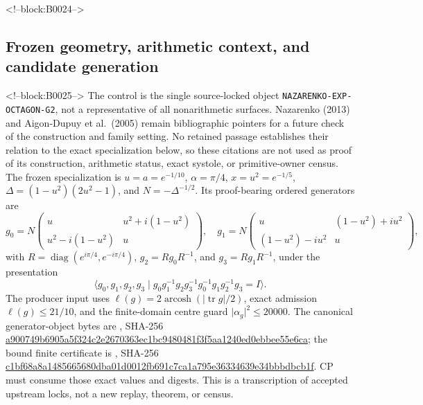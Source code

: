 \documentclass[11pt,a4paper]{article}
\begin{document}
<!--block:B0024-->
\hypertarget{frozen-geometry-arithmetic-context-and-candidate-generation}{%
\subsection{Frozen geometry, arithmetic context, and candidate generation}\label{frozen-geometry-arithmetic-context-and-candidate-generation}}

<!--block:B0025-->
The control is the single source-locked object \texttt{NAZARENKO-EXP-OCTAGON-G2}, not a representative of all nonarithmetic surfaces. Nazarenko (2013)
\citep{P33-S01}
 and Aigon-Dupuy et al.~(2005)
\citep{P33-S02}
 remain bibliographic pointers for a future check of the construction and family setting. No retained passage establishes their relation to the exact specialization below, so these citations are not used as proof of its construction, arithmetic status, exact systole, or primitive-owner census. The frozen specialization is \(u=a=e^{-1/10}\), \(\alpha=\pi/4\), \(x=u^2=e^{-1/5}\), \(\Delta=(1-u^2)(2u^2-1)\), and \(N=-\Delta^{-1/2}\). Its proof-bearing ordered generators are
\[
 g_0=N\begin{pmatrix}u&u^2+i(1-u^2)\\u^2-i(1-u^2)&u\end{pmatrix},\quad
 g_1=N\begin{pmatrix}u&(1-u^2)+iu^2\\(1-u^2)-iu^2&u\end{pmatrix},
\]
with \(R=\operatorname{diag}(e^{i\pi/4},e^{-i\pi/4})\), \(g_2=Rg_0R^{-1}\), and \(g_3=Rg_1R^{-1}\), under the presentation
\[
 \langle g_0,g_1,g_2,g_3\mid g_0g_1^{-1}g_2g_3^{-1}g_0^{-1}g_1g_2^{-1}g_3=I\rangle .
\]
The producer input uses \(\ell(g)=2\operatorname{arcosh}(|\operatorname{tr}g|/2)\), exact admission \(\ell(g)\leq21/10\), and the finite-domain centre guard \(\lvert\alpha_g\rvert^2\leq20000\). The canonical generator-object bytes are , SHA-256 \url{a900749b6905a5f324c2e2670363ec1bc9480481f3f5aa1240ed0ebbee55e6ca}; the bound finite certificate is , SHA-256 \url{c1bf68a8a1485665680dba01d0012fb691c7ca1a795e36334639e34bbbdbcb1f}. CP must consume those exact values and digests. This is a transcription of accepted upstream locks, not a new replay, theorem, or census.
\end{document}
